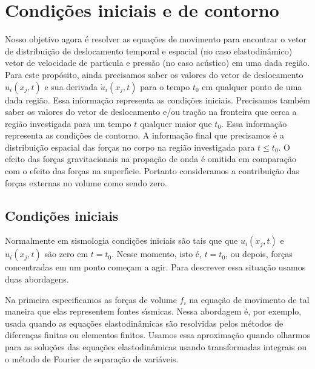 %

\section{Condi\c{c}\~oes iniciais e de contorno}

Nosso objetivo agora \'e resolver as equa\c{c}\~oes de movimento
para encontrar o vetor de distribui\c{c}\~ao de deslocamento
temporal e espacial (no caso elastodin\^amico) vetor de velocidade
de part\'\i cula e press\~ao (no caso ac\'ustico) em uma dada
regi\~ao. Para este prop\'osito, ainda precisamos saber os
valores do vetor de deslocamento $u_{i}(x_{j},t)$ e sua derivada
$\dot{u}_{i}(x_{j},t)$ para o tempo $t_{0}$ em qualquer ponto de
uma dada regi\~ao. Essa informa\c{c}\~ao representa as
condi\c{c}\~oes iniciais. Precisamos tamb\'em saber os valores
do vetor de deslocamento e/ou tra\c{c}\~ao na fronteira que cerca
a regi\~ao investigada para um tempo $t$ qualquer maior que
$t_{0}$. Essa informa\c{c}\~ao representa as condi\c{c}\~oes de
contorno. A informa\c{c}\~ao final que precisamos \'e a
distribui\c{c}\~ao espacial das for\c{c}as no corpo na regi\~ao
investigada para $t \leq t_{0}$. O efeito das for\c{c}as
gravitacionais  na propa\c{c}\~ao de onda \'e omitida em
compara\c{c}\~ao  com o efeito das for\c{c}as na superf\'\i cie.
Portanto consideramos a contribui\c{c}\~ao das for\c{c}as
externas no volume como sendo zero.

\subsection{Condi\c{c}\~oes iniciais}

Normalmente em sismologia condi\c{c}\~oes iniciais s\~ao tais que que
$u_{i}(x_{j},t)$ e $\dot{u}_{i}(x_{j},t)$ s\~ao zero em $t=t_{0}$. Nesse
momento, isto \'e, $t=t_{0}$, ou depois, for\c{c}as concentradas em um
ponto come\c{c}am a agir. Para descrever essa situa\c{c}\~ao usamos
duas abordagens.

Na primeira especificamos as for\c{c}as de volume $f_{i}$ na
equa\c{c}\~ao de movimento de tal maneira que elas representem fontes
s\'\i smicas. Nessa abordagem \'e, por exemplo, usada quando as
equa\c{c}\~oes elastodin\^amicas s\~ao resolvidas pelos m\'etodos de
diferen\c{c}as finitas ou elementos finitos. Usamos essa
aproxima\c{c}\~ao quando olharmos para as solu\c{c}\~oes das
equa\c{c}\~oes elastodin\^amicas usando transformadas integrais ou o
m\'etodo de Fourier de separa\c{c}\~ao de vari\'aveis.

